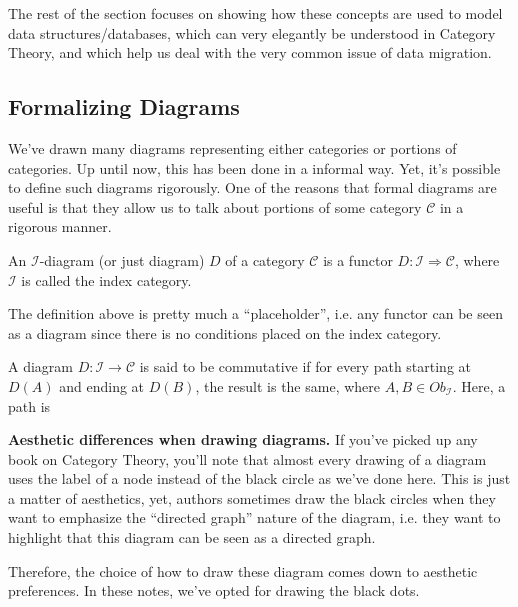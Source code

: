 The rest of the section focuses on showing how these concepts are used to
model data structures/databases, which can very
elegantly be understood in Category Theory, and which help us deal with the very
common issue of data migration.

\subsection{Formalizing Diagrams}

We've drawn many diagrams representing either categories or portions of categories. Up
until now, this has been done in a informal way. Yet, it's possible to define such diagrams rigorously.
One of the reasons that formal diagrams are useful is that they allow us to talk about portions
of some category $\mathcal C$ in a rigorous manner.

\begin{definition}[Diagram]
  An $\mathcal I$-diagram (or just diagram) $D$ of a category $\mathcal C$ is a functor
  $D: \mathcal I \Rightarrow \mathcal C$, where $\mathcal I$ is called the index category.
\end{definition}

The definition above is pretty much a ``placeholder'', i.e. any functor can be seen as
a diagram since there is no conditions placed on the index category.

\begin{definition}
  A diagram $D:\mathcal I \to \mathcal C$ is said to be commutative if 
  for every path starting at $D(A)$ and ending at $D(B)$, the result is the same,
  where $A, B \in Ob_\mathcal I$. Here, a path is 
\end{definition}

\begin{shaded}
  \textbf{Aesthetic differences when drawing diagrams.}
  If you've picked up any book on Category Theory, you'll note that almost every
  drawing of a diagram uses the label of a node instead of the black circle
  as we've done here. This is just a matter of aesthetics, yet, authors
  sometimes draw the black circles when they want to emphasize the
  ``directed graph'' nature of the diagram, i.e. they want to highlight
  that this diagram can be seen as a directed graph.

  Therefore, the choice of how to draw these diagram comes down to
  aesthetic preferences. In these notes, we've opted for drawing the
  black dots.
\end{shaded}

